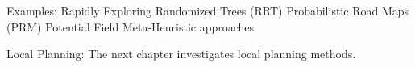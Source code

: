 Examples: 
Rapidly Exploring Randomized Trees (RRT)
Probabilistic Road Maps (PRM)
Potential Field
Meta-Heuristic approaches

Local Planning:
The next chapter investigates local planning methods.





